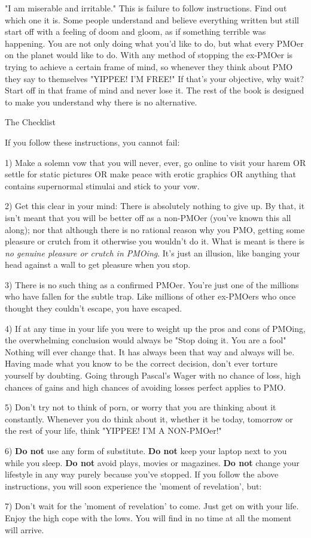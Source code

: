       "I am miserable and irritable." This is failure to follow instructions. Find out which one it is. Some people understand and believe everything written but still start off with a feeling of doom and gloom, as if something terrible was happening. You are not only doing what you'd like to do, but what every PMOer on the planet would like to do. With any method of stopping the ex-PMOer is trying to achieve a certain frame of mind, so whenever they think about PMO they say to themselves "YIPPEE! I'M FREE!" If that's your objective, why wait? Start off in that frame of mind and never lose it. The rest of the book is designed to make you understand why there is no alternative.

The Checklist

  If you follow these instructions, you cannot fail:

    1) Make a solemn vow that you will never, ever, go online to visit your harem OR settle for static pictures OR make peace with erotic graphics OR anything that contains supernormal stimulai and stick to your vow.

    2) Get this clear in your mind: There is absolutely nothing to give up. By that, it isn't meant that you will be better off as a non-PMOer (you've known this all along); nor that although there is no rational reason why you PMO, getting some pleasure or crutch from it otherwise you wouldn't do it. What is meant is there is \textit{no genuine pleasure or crutch in PMOing}. It's just an illusion, like banging your head against a wall to get pleasure when you stop.

    3) There is no such thing as a confirmed PMOer. You're just one of the millions who have fallen for the subtle trap. Like millions of other ex-PMOers who once thought they couldn't escape, you have escaped.

    4) If at any time in your life you were to weight up the pros and cons of PMOing, the overwhelming conclusion would always be "Stop doing it. You are a fool" Nothing will ever change that. It has always been that way and always will be. Having made what you know to be the correct decision, don't ever torture yourself by doubting. Going through Pascal's Wager with no chance of loss, high chances of gains and high chances of avoiding losses perfect applies to PMO.

    5) Don't try not to think of porn, or worry that you are thinking about it constantly. Whenever you do think about it, whether it be today, tomorrow or the rest of your life, think "YIPPEE! I'M A NON-PMOer!"

    6) \textbf{Do not} use any form of substitute. \textbf{Do not} keep your laptop next to you while you sleep. \textbf{Do not} avoid plays, movies or magazines. \textbf{Do not} change your lifestyle in any way purely because you've stopped. If you follow the above instructions, you will soon experience the 'moment of revelation', but:

    7) Don't wait for the 'moment of revelation' to come. Just get on with your life. Enjoy the high cope with the lows. You will find in no time at all the moment will arrive.
